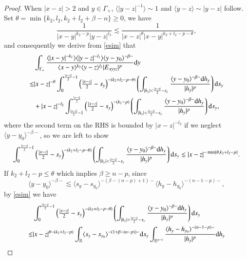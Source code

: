 \documentclass[11pt,reqno]{amsart}
\def\d{{\rm d}}
\numberwithin{equation}{section}
\theoremstyle{definition}
\begin{document}
\begin{appendix}
\begin{proof}
		When $|x-z|>2$ and $y\in\Gamma_+$, $\langle |y-z|^{-1}\rangle\sim1$ and $\langle y-z\rangle\sim|y-z|$ follow. Set $\theta=\min\{k_2,l_2,k_2+l_2+\beta-n\}\geq0$, we have
		\begin{equation*}
			\frac{1}{|x-y|^{k_2-p}|y-z|^{l_2}}\lesssim\frac{1}{|x-z|^\theta|x-y|^{k_2+l_2-p-\theta}},
		\end{equation*}
		and consequently we derive from \eqref{esim} that
		\begin{equation}\label{l8}
			\begin{split}
				&\int_{\Gamma_+}\frac{\langle|x-y|^{-k_1}\rangle\langle|y-z|^{-l_1}\rangle\langle y-y_0\rangle^{-\beta-}}{\langle x-y\rangle^{k_2}\langle y-z\rangle^{l_2}|E_{xyyz}|^p}\d y\\
				\lesssim&|x-z|^{-\theta}\int_0^{\frac{|x-z|}{2}-1}\left(\mbox{$\frac{|x-z|}{2}-s_y$}\right)^{-(k_2+l_2-p-\theta)}\left(\int_{|h_y|<\frac{|x-z|}{2}-s_y}\frac{\langle y-y_0\rangle^{-\beta-}\d h_y}{|h_y|^p}\right)\d s_y\\
				&+|x-z|^{-l_2}\int_{\frac{|x-z|}{2}-1}^{\frac{|x-z|}{2}}\left(\mbox{$\frac{|x-z|}{2}-s_y$}\right)^{-(k_1-p)}\left(\int_{|h_y|<\frac{|x-z|}{2}-s_y}\frac{\langle y-y_0\rangle^{-\beta-}\d h_y}{|h_y|^p}\right)\d s_y,
			\end{split}
		\end{equation}
		where the second term on the RHS is bounded by $|x-z|^{-l_2}$ if we neglect $\langle y-y_0\rangle^{-\beta-}$, so we are left to show
		\begin{equation*}
			\int_0^{\frac{|x-z|}{2}-1}\left(\mbox{$\frac{|x-z|}{2}-s_y$}\right)^{-(k_2+l_2-p-\theta)}\left(\int_{|h_y|<\frac{|x-z|}{2}-s_y}\frac{\langle y-y_0\rangle^{-\beta-}\d h_y}{|h_y|^p}\right)\d s_y\lesssim|x-z|^{-\min\{\theta,k_2+l_2-p\}}.
		\end{equation*}
		If $k_2+l_2-p\leq\theta$ which implies $\beta\geq n-p$, since
		\begin{equation*}
			\langle y-y_0\rangle^{-\beta-}\lesssim\langle s_y-s_{y_0}\rangle^{-(\beta-(n-p)+1)-}\langle h_y-h_{y_0}\rangle^{-(n-1-p)-},
		\end{equation*}
		by \eqref{esim} we have
		\begin{equation*}\label{l11}
			\begin{split}
				&\int_0^{\frac{|x-z|}{2}-1}\left(\mbox{$\frac{|x-z|}{2}-s_y$}\right)^{-(k_2+l_2-p-\theta)}\left(\int_{|h_y|<\frac{|x-z|}{2}-s_y}\frac{\langle y-y_0\rangle^{-\beta-}\d h_y}{|h_y|^p}\right)\d s_y\\
				\lesssim&|x-z|^{\theta-(k_2+l_2-p)}\int_\mathbb{R}\langle s_y-s_{y_0}\rangle^{-(1+\beta-(n-p))-}\d s_y\int_{\mathbb{R}^{n-1}}\frac{\langle h_y-h_{y_0}\rangle^{-(n-1-p)-}}{|h_y|^p}\d h_y\\

\end{split}
\end{equation*}
\end{proof}
\end{appendix}
\end{document}

